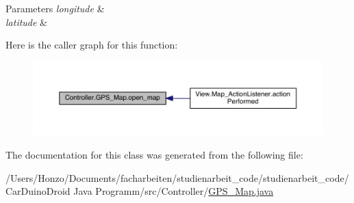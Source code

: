 \begin{DoxyParams}{Parameters}
{\em longitude} & \\
\hline
{\em latitude} & \\
\hline
\end{DoxyParams}


Here is the caller graph for this function\+:
\nopagebreak
\begin{figure}[H]
\begin{center}
\leavevmode
\includegraphics[width=350pt]{class_controller_1_1_g_p_s___map_a3464e3a900a1d878cb4487448b23fd7b_icgraph}
\end{center}
\end{figure}




The documentation for this class was generated from the following file\+:\begin{DoxyCompactItemize}
\item 
/\+Users/\+Honzo/\+Documents/facharbeiten/studienarbeit\+\_\+code/studienarbeit\+\_\+code/\+Car\+Duino\+Droid Java Programm/src/\+Controller/\hyperlink{_g_p_s___map_8java}{G\+P\+S\+\_\+\+Map.\+java}\end{DoxyCompactItemize}
